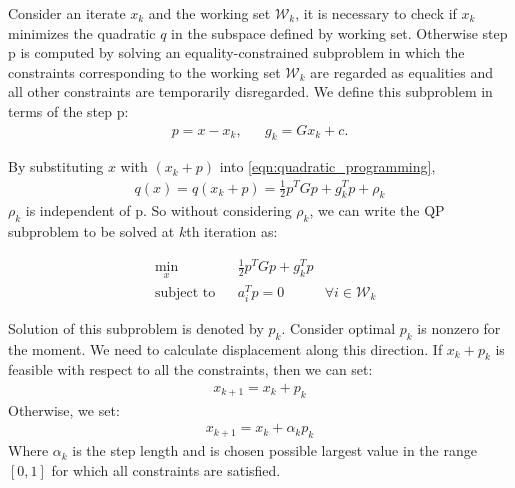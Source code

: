 Consider an iterate $x_k$ and the working set $\mathcal{W}_k$, it is necessary to check if $x_k$ minimizes the quadratic $q$ in the subspace defined by working set. Otherwise step p is computed by solving an equality-constrained subproblem in which the constraints corresponding to the working set $\mathcal{W}_k$ are regarded as equalities and all other constraints are temporarily disregarded. We define this subproblem in terms of the step p:
\begin{equation*}
	\begin{aligned}
		p = x - x_k, & & g_k = Gx_k + c.
	\end{aligned}
\end{equation*}

By substituting $x$ with $(x_k+p)$ into \ref{eqn:quadratic_programming},
\begin{equation*}
	\begin{aligned}
		q(x) = q(x_k+p)= \frac{1}{2}p^TGp+g_k^Tp+\rho_k
	\end{aligned}
\end{equation*}
$\rho_k$ is independent of p. So without considering $\rho_k$, we can write the QP subproblem to be solved at $k$th iteration as:

\begin{equation}
	\begin{aligned}
		& \underset{x}{\text{min}} & & \frac{1}{2}p^{T}Gp+g_{k}^{T}p \\
& \text{subject to} & &  a_{i}^{T}p = 0 & \forall i\in \mathcal{W}_k
	\end{aligned}
	\label{eqn:Active_set_1}
\end{equation}

Solution of this subproblem is denoted by $p_k$. Consider optimal $p_k$ is nonzero for the moment. We need to calculate displacement along this direction. If $x_k+p_k$ is feasible with respect to all the constraints, then we can set:
\begin{equation*}
\begin{aligned}
	x_{k+1} = x_k + p_k
\end{aligned}
\end{equation*} 
Otherwise, we set:
\begin{equation}
	\begin{aligned}
		x_{k+1} = x_k + \alpha_{k}p_{k}
	\end{aligned}
	\label{eqn:Active_set_2}
\end{equation}
Where $\alpha_k$ is the step length and is chosen possible largest value in the range $[0,1]$ for which all constraints are satisfied.

